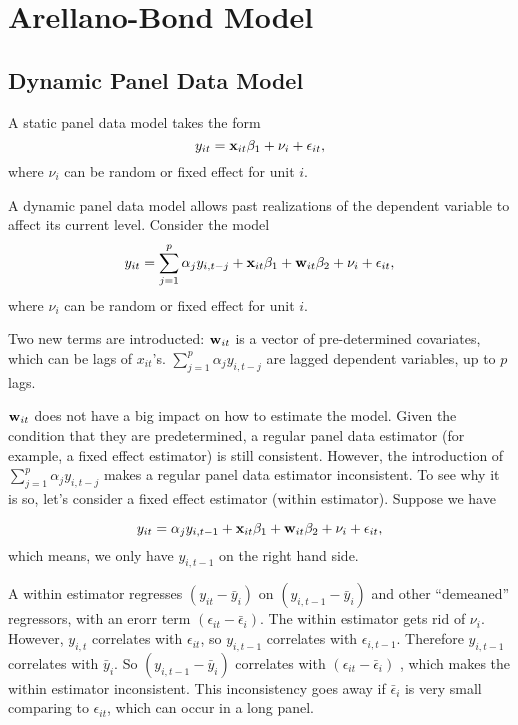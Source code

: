 \chapter{Arellano-Bond Model}

\section{Dynamic Panel Data Model}

A static panel data model takes the form
\begin{equation}
y_{it}= {\bf x}_{it} \beta_1 + \nu_i + \epsilon_{it}, 
\end{equation}
where $\nu_i$ can be random or fixed effect for unit $i$.

A dynamic panel data model allows past realizations of the dependent
variable to affect its current level.  Consider the model
\begin{equation}
y_{it}= \sum_{j=1}^p \alpha_j y_{i, t-j} + {\bf x}_{it} \beta_1 + {\bf w}_{it} \beta_2 + \nu_i + \epsilon_{it}, 
\label{eqn1}
\end{equation}
where $\nu_i$ can be random or fixed effect for unit $i$.

Two new terms are introducted: ${\bf w}_{it}$ is a vector of pre-determined covariates, which can be lags of $x_{it}$'s.   $\sum_{j=1}^p \alpha_j y_{i, t-j}$  are lagged dependent variables, up to $p$ lags.  

${\bf w}_{it}$  does not have a big impact on how to estimate the model.  Given the condition that they are predetermined, a regular panel data estimator (for example, a fixed effect estimator) is still consistent.  However, the introduction of   $\sum_{j=1}^p \alpha_j y_{i, t-j}$ makes a regular panel data estimator inconsistent.  To see why it is so, let's consider a fixed effect estimator (within estimator).  Suppose we have

\begin{equation}
y_{it}= \alpha_j y_{i, t-1} + {\bf x}_{it} \beta_1 + {\bf w}_{it} \beta_2 + \nu_i + \epsilon_{it}, 
\end{equation}
which means, we only have $y_{i, t-1}$ on the right hand side.  

A within estimator regresses $(y_{it} - \bar y_i)$ on $(y_{i, t-1} -
\bar y_i)$ and other ``demeaned'' regressors, with an erorr term
$(\epsilon_{it} - \bar \epsilon_{i})$.  The within estimator gets rid
of $\nu_i$.  However, $y_{i,t}$ correlates with $\epsilon_{it}$, so
$y_{i,t-1}$ correlates with $\epsilon_{i,t-1}$.  Therefore $y_{i,t-1}$
correlates with $\bar y_i$.  So $(y_{i, t-1} - \bar y_i)$ correlates
with $(\epsilon_{it} - \bar \epsilon_{i})$ , which makes the within
estimator inconsistent.  This inconsistency goes away if $\bar \epsilon_i$ is very small comparing to $\epsilon_{it}$, which can occur in a long panel.

